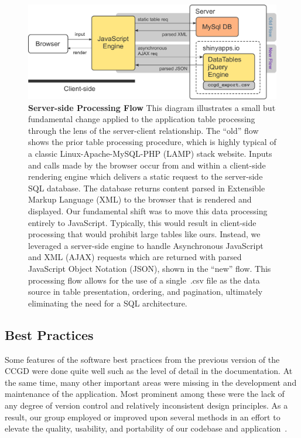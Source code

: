 \documentclass[10pt]{report}
\begin{document}
\begin{figure}[H]
    \centering
    \includegraphics[width=\textwidth]{fig/parse_flow.pdf}
    \caption[Server-side Processing Flow]{\textbf{Server-side Processing Flow} This diagram illustrates a small but fundamental change applied to the application table processing through the lens of the server-client relationship. The ``old'' flow shows the prior table processing procedure, which is highly typical of a classic Linux-Apache-MySQL-PHP (LAMP) stack website. Inputs and calls made by the browser occur from and within a client-side rendering engine which delivers a static request to the server-side SQL database. The database returns content parsed in Extensible Markup Language (XML) to the browser that is rendered and displayed. Our fundamental shift was to move this data processing entirely to JavaScript. Typically, this would result in client-side processing that would prohibit large tables like ours. Instead, we leveraged a server-side engine to handle Asynchronous JavaScript and XML (AJAX) requests which are returned with parsed JavaScript Object Notation (JSON), shown in the ``new'' flow. This processing flow allows for the use of a single~.csv file as the data source in table presentation, ordering, and pagination, ultimately eliminating the need for a SQL architecture.}\label{fig:parseFlow}
\end{figure}

\subsection{Best Practices}
Some features of the software best practices from the previous version of the CCGD were done quite well such as the level of detail in the documentation. At the same time, many other important areas were missing in the development and maintenance of the application. Most prominent among these were the lack of any degree of version control and relatively inconsistent design principles. As a result, our group employed or improved upon several methods in an effort to elevate the quality, usability, and portability of our codebase and application~\cite{finchamSoftwareDevelopmentPractices2011}.
\end{document}

